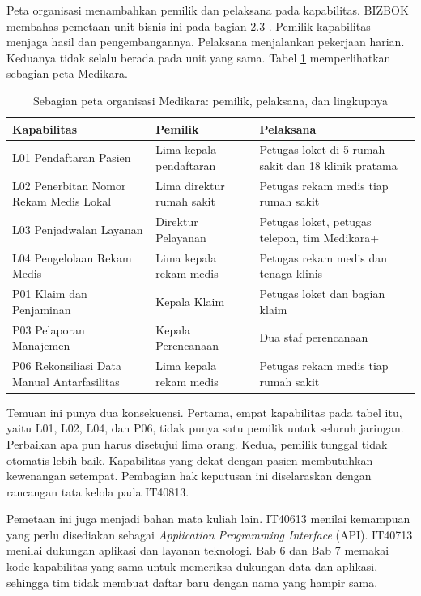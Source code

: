 Peta organisasi menambahkan pemilik dan pelaksana pada kapabilitas. BIZBOK membahas pemetaan unit
bisnis ini pada bagian 2.3 \cite{bizbok15}. Pemilik kapabilitas menjaga hasil dan pengembangannya.
Pelaksana menjalankan pekerjaan harian. Keduanya tidak selalu berada pada unit yang sama. Tabel
\ref{tab:ch05-peta-organisasi} memperlihatkan sebagian peta Medikara.

\begin{table}[!htb]
  \centering
  \caption{Sebagian peta organisasi Medikara: pemilik, pelaksana, dan lingkupnya}
  \label{tab:ch05-peta-organisasi}
  \small
  \begin{tabularx}{\textwidth}{>{\raggedright\arraybackslash}p{3.6cm}>{\raggedright\arraybackslash}p{2.9cm}>{\raggedright\arraybackslash}X}
    \hline
    \textbf{Kapabilitas} & \textbf{Pemilik} & \textbf{Pelaksana} \\
    \hline
    L01 Pendaftaran Pasien & Lima kepala pendaftaran & Petugas loket di 5 rumah sakit dan 18 klinik pratama \\
    \hline
    L02 Penerbitan Nomor Rekam Medis Lokal & Lima direktur rumah sakit & Petugas rekam medis tiap rumah sakit \\
    \hline
    L03 Penjadwalan Layanan & Direktur Pelayanan & Petugas loket, petugas telepon, tim Medikara+ \\
    \hline
    L04 Pengelolaan Rekam Medis & Lima kepala rekam medis & Petugas rekam medis dan tenaga klinis \\
    \hline
    P01 Klaim dan Penjaminan & Kepala Klaim & Petugas loket dan bagian klaim \\
    \hline
    P03 Pelaporan Manajemen & Kepala Perencanaan & Dua staf perencanaan \\
    \hline
    P06 Rekonsiliasi Data Manual Antarfasilitas & Lima kepala rekam medis & Petugas rekam medis tiap rumah sakit \\
    \hline
  \end{tabularx}
\end{table}

Temuan ini punya dua konsekuensi. Pertama, empat kapabilitas pada tabel itu, yaitu L01, L02, L04,
dan P06, tidak punya satu pemilik untuk seluruh jaringan. Perbaikan apa pun harus disetujui lima
orang. Kedua, pemilik tunggal tidak otomatis lebih baik. Kapabilitas yang dekat dengan pasien
membutuhkan kewenangan setempat. Pembagian hak keputusan ini diselaraskan dengan rancangan tata
kelola pada IT40813.

Pemetaan ini juga menjadi bahan mata kuliah lain. IT40613 menilai kemampuan yang perlu disediakan
sebagai \textit{Application Programming Interface} (API). IT40713 menilai dukungan aplikasi dan
layanan teknologi. Bab 6 dan Bab 7 memakai kode kapabilitas yang sama untuk memeriksa dukungan data
dan aplikasi, sehingga tim tidak membuat daftar baru dengan nama yang hampir sama.

